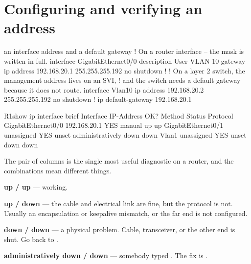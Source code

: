 \section{Configuring and verifying an address}

\begin{config}{an interface address and a default gateway}
! On a router interface -- the mask is written in full.
interface GigabitEthernet0/0
 description User VLAN 10 gateway
 ip address 192.168.20.1 255.255.255.192
 no shutdown
!
! On a layer 2 switch, the management address lives on an SVI,
! and the switch needs a default gateway because it does not route.
interface Vlan10
 ip address 192.168.20.2 255.255.255.192
 no shutdown
!
ip default-gateway 192.168.20.1
\end{config}

\begin{verify}{R1}{show ip interface brief}
Interface              IP-Address      OK? Method Status                Protocol
GigabitEthernet0/0     192.168.20.1    YES manual up                    up
GigabitEthernet0/1     unassigned      YES unset  administratively down down
Vlan1                  unassigned      YES unset  down                  down
\end{verify}

\begin{conceptbox}
The pair of columns is the single most useful diagnostic on a router, and the
combinations mean different things.
\begin{tight}
  \item \textbf{up / up} --- working.
  \item \textbf{up / down} --- the cable and electrical link are fine, but the
        protocol is not. Usually an encapsulation or keepalive mismatch, or the
        far end is not configured.
  \item \textbf{down / down} --- a physical problem. Cable, transceiver, or the
        other end is shut. Go back to .
  \item \textbf{administratively down / down} --- somebody typed
        . The fix is .
\end{tight}
\end{conceptbox}

